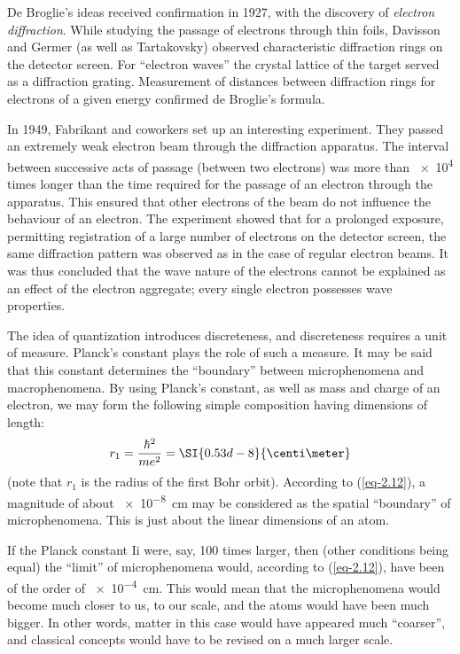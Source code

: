 \documentclass[a4paper,sfsidenotes,colorlinks=true]{tufte-book}
\numberwithin{equation}{section}
\numberwithin{figure}{section}
\begin{document}
De Broglie's ideas received confirmation in 1927, with the discovery
of \emph{electron diffraction}. While studying the passage of
electrons through thin foils, Davisson and Germer (as well as
Tartakovsky) observed characteristic diffraction rings on the detector
screen. For ``electron waves'' the crystal lattice of the target served
as a diffraction grating. Measurement of distances between
diffraction rings for electrons of a given energy confirmed de
Broglie's formula.

In 1949, Fabrikant and coworkers set up an interesting
experiment. They passed an extremely weak electron beam through the
diffraction apparatus. The interval between successive acts of passage
(between two electrons) was more than \num{e4} times longer than the
time required for the passage of an electron through the
apparatus. This ensured that other electrons of the beam do not
influence the behaviour of an electron. The experiment showed that for
a prolonged exposure, permitting registration of a large number of
electrons on the detector screen, the same diffraction pattern was
observed as in the case of regular electron beams. It was thus
concluded that the wave nature of the electrons cannot be explained as
an effect of the electron aggregate; every single electron possesses
wave properties.

The idea of quantization 
introduces discreteness, and discreteness requires a unit of
measure. Planck's constant plays the role of such a measure. It may be
said that this constant determines the ``boundary'' between
microphenomena and macrophenomena. By using Planck's constant, as well
as mass and charge of an electron, we may form the following simple
composition having dimensions of length:
\begin{equation}%
r_{1} = \frac{\hbar^{2}}{me^{2}} = \SI{0.53d-8}{\centi\meter}
\label{eq-2.12} 
\end{equation}
(note that $r_{1}$ is the radius of the first Bohr orbit). According
to (\ref{eq-2.12}), a magnitude of about \SI{e-8}{\centi\meter} may be
considered as the spatial ``boundary'' of microphenomena. This is just
about the linear dimensions of an atom.

If the Planck constant Ii were, say, 100 times larger, then (other
conditions being equal) the ``limit'' of microphenomena would,
according to (\ref{eq-2.12}), have been of the order of
\SI{e-4}{\centi\meter}. This would mean that the microphenomena
would become much closer to us, to our scale, and the atoms would have
been much bigger. In other words, matter in this case would have
appeared much ``coarser'', and classical concepts would have to be
revised on a much larger scale.
\end{document}
